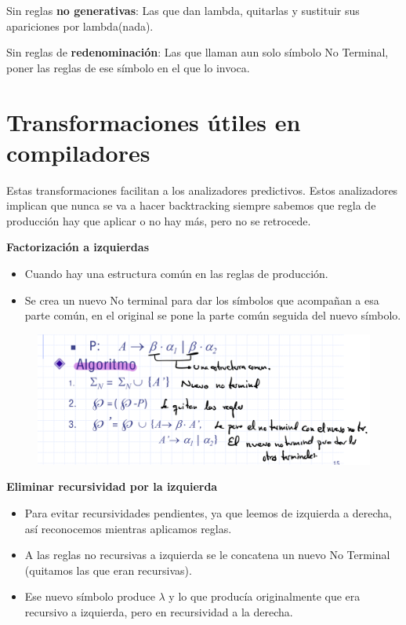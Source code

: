 \documentclass[12pt, twoside, openright]{report} %
\begin{document}
Sin reglas \textbf{no generativas}: Las que dan lambda, quitarlas y
sustituir sus apariciones por lambda(nada).

Sin reglas de \textbf{redenominación}: Las que llaman aun solo símbolo
No Terminal, poner las reglas de ese símbolo en el que lo invoca.


\section{Transformaciones útiles en compiladores}

Estas transformaciones facilitan a los analizadores predictivos. Estos
analizadores implican que nunca se va a hacer backtracking siempre
sabemos que regla de producción hay que aplicar o no hay más, pero no se
retrocede.

\textbf{Factorización a izquierdas}

\begin{itemize}
\item
  Cuando hay una estructura común en las reglas de producción.
\item
  Se crea un nuevo No terminal para dar los símbolos que acompañan a esa
  parte común, en el original se pone la parte común seguida del nuevo
  símbolo.
\end{itemize}

\begin{figure}[H]
	{\includegraphics[scale=.3]{Untitled 1.png}}
\end{figure}

\textbf{Eliminar recursividad por la izquierda}

\begin{itemize}
\item
  Para evitar recursividades pendientes, ya que leemos de izquierda a
  derecha, así reconocemos mientras aplicamos reglas.
\item
  A las reglas no recursivas a izquierda se le concatena un nuevo No
  Terminal (quitamos las que eran recursivas).
\item
  Ese nuevo símbolo produce \(\lambda\) y lo que producía originalmente
  que era recursivo a izquierda, pero en recursividad a la derecha.
\end{itemize}
\end{document}
